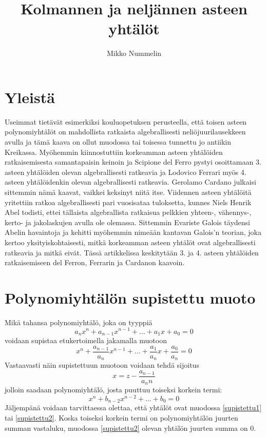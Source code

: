\documentclass[a4paper,12pt,twoside]{article}
\begin{document}
\title{Kolmannen ja neljännen asteen yhtälöt}
\author{Mikko Nummelin}
\maketitle
\tableofcontents
\section{Yleistä}
Useimmat tietävät esimerkiksi kouluopetuksen perusteella, että toisen asteen polynomiyhtälöt on mahdollista ratkaista algebrallisesti neliöjuurilausekkeen avulla ja tämä kaava on ollut muodossa tai toisessa tunnettu jo antiikin Kreikassa. Myöhemmin kiinnostuttiin korkeamman asteen yhtälöiden ratkaisemisesta samantapaisin keinoin ja Scipione del Ferro pystyi osoittamaan 3. asteen yhtälöiden olevan algebrallisesti ratkeavia ja Lodovico Ferrari myös 4. asteen yhtälöidenkin olevan algebrallisesti ratkeavia. Gerolamo Cardano julkaisi sittemmin nämä kaavat, vaikkei keksinyt niitä itse. Viidennen asteen yhtälöitä yritettiin ratkoa algebrallisesti pari vuosisataa tuloksetta, kunnes Niels Henrik Abel todisti, ettei tällaista algebrallista ratkaisua pelkkien yhteen-, vähennys-, kerto- ja jakolaskujen avulla ole olemassa. Sittemmin Evariste Galois täydensi Abelin havaintoja ja kehitti myöhemmin nimeään kantavan Galois'n teorian, joka kertoo yksityiskohtaisesti, mitkä korkeamman asteen yhtälöt ovat algebrallisesti ratkeavia ja mitkä eivät. Tässä artikkelissa keskitytään 3. ja 4. asteen yhtälöiden ratkaisemiseen del Ferron, Ferrarin ja Cardanon kaavoin.
\section{Polynomiyhtälön supistettu muoto}
Mikä tahansa polynomiyhtälö, joka on tyyppiä
$$
a_n x^n+a_{n-1} x^{n-1}+\ldots+a_1 x+a_0 = 0
$$
voidaan supistaa etukertoimella jakamalla muotoon
\begin{equation}
  \label{supistettu1}
x^n+\frac{a_{n-1}}{a_n} x^{n-1}+\ldots+\frac{a_1}{a_n} x+\frac{a_0}{a_n} = 0
\end{equation}
Vastaavasti näin supistettuun muotoon voidaan tehdä sijoitus
$$
x=z-\frac{a_{n-1}}{a_n n}
$$
jolloin saadaan polynomiyhtälö, josta puuttuu toiseksi korkein termi:
\begin{equation}
  \label{supistettu2}
x^n+b_{n-2} x^{n-2}+\ldots+b_0 = 0
\end{equation}
Jäljempänä voidaan tarvittaessa olettaa, että yhtälöt ovat muodossa \ref{supistettu1} tai \ref{supistettu2}. Koska toiseksi korkein termi on polynomiyhtälön juurten summan vastaluku, muodossa \ref{supistettu2} olevan yhtälön juurten summa on 0.
\end{document}
